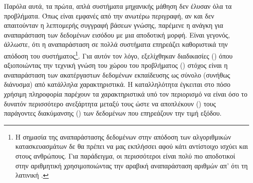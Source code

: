 Παρόλα αυτά, τα πρώτα, απλά συστήματα μηχανικής μάθηση δεν έλυσαν όλα τα προβλήματα. Όπως είναι εμφανές από την ανωτέρω περιγραφή, αν και δεν απαιτούνταν η λεπτομερής συγγραφή βάσεων γνώσης, παρέμενε η ανάγκη για αναπαράσταση των δεδομένων εισόδου με μια αποδοτική μορφή. Είναι γεγονός, άλλωστε, ότι η αναπαράσταση σε πολλά συστήματα επηρεάζει καθοριστικά την απόδοση του συστήματος\footnote{Η σημασία της αναπαράστασης δεδομένων στην απόδοση των αλγοριθμικών κατασκευασμάτων δε θα πρέπει να μας εκπλήσσει αφού κάτι αντίστοιχο ισχύει και στους ανθρώπους. Για παράδειγμα, οι περισσότεροι είναι πολύ πιο αποδοτικοί στην αριθμητική χρησιμοποιώντας την αραβική αναπαράσταση αριθμών απ' ότι τη λατινική \cite{goodfellow2016deep}.}. Για αυτόν τον λόγο, εξελίχθηκαν διαδικασίες  () όπου αξιοποιώντας την τεχνική γνώση του χώρου του προβλήματος () στόχος είναι η αναπαράσταση των ακατέργαστων δεδομένων εκπαίδευσης ως σύνολο (συνήθως διάνυσμα) από κατάλληλα χαρακτηριστικά. Η καταλληλότητα έγκειται στο πόσο χρήσιμη πληροφορία παρέχουν τα χαρακτηριστικά υπό τον περιορισμό να είναι όσο το δυνατόν περισσότερο ανεξάρτητα μεταξύ τους ώστε να αποπλέκουν () τους παράγοντες διακύμανσης () των δεδομένων που επηρεάζουν την τιμή εξόδου\cite{goodfellow2016deep}. \par

